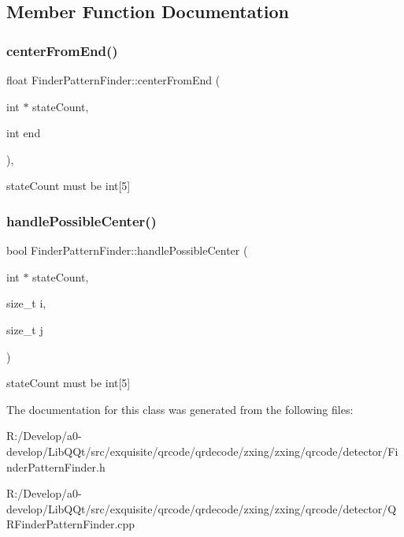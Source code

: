 \subsection{Member Function Documentation}
\mbox{\label{classzxing_1_1qrcode_1_1_finder_pattern_finder_a37739136a32f627baa3720b998c2f58c}} 
\subsubsection{\texorpdfstring{center\+From\+End()}{centerFromEnd()}}
{\footnotesize\ttfamily float Finder\+Pattern\+Finder\+::center\+From\+End (\begin{DoxyParamCaption}\item[{int $\ast$}]{state\+Count,  }\item[{int}]{end }\end{DoxyParamCaption})\hspace{0.3cm}{\ttfamily [static]}, {\ttfamily [protected]}}

state\+Count must be int\mbox{[}5\mbox{]} \mbox{\label{classzxing_1_1qrcode_1_1_finder_pattern_finder_a757ba8b0853dea8f4244da44ea4ba58f}} 
\subsubsection{\texorpdfstring{handle\+Possible\+Center()}{handlePossibleCenter()}}
{\footnotesize\ttfamily bool Finder\+Pattern\+Finder\+::handle\+Possible\+Center (\begin{DoxyParamCaption}\item[{int $\ast$}]{state\+Count,  }\item[{size\+\_\+t}]{i,  }\item[{size\+\_\+t}]{j }\end{DoxyParamCaption})\hspace{0.3cm}{\ttfamily [protected]}}

state\+Count must be int\mbox{[}5\mbox{]} 

The documentation for this class was generated from the following files\+:\begin{DoxyCompactItemize}
\item 
R\+:/\+Develop/a0-\/develop/\+Lib\+Q\+Qt/src/exquisite/qrcode/qrdecode/zxing/zxing/qrcode/detector/Finder\+Pattern\+Finder.\+h\item 
R\+:/\+Develop/a0-\/develop/\+Lib\+Q\+Qt/src/exquisite/qrcode/qrdecode/zxing/zxing/qrcode/detector/Q\+R\+Finder\+Pattern\+Finder.\+cpp\end{DoxyCompactItemize}

